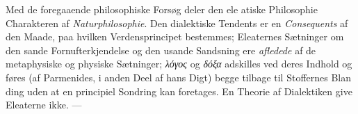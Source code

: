 \documentclass[12pt,a4paper]{book}
\newcommand{\gk}[1]{\textit{#1}}
\begin{document}
%
%
Med de foregaaende philosophiske Forsøg deler den ele\-%
atiske Philosophie Charakteren af \emph{Naturphilosophie}. Den
dialektiske Tendents er en \emph{Consequents} af den Maade, paa
hvilken Verdensprincipet bestemmes; Eleaternes Sætninger om
den sande Fornufterkjendelse og den usande Sandsning ere
\emph{afledede} af de metaphysiske og physiske Sætninger; \gk{λόγος}
og \gk{δόξα} adskilles ved deres Indhold og føres (af Parmenides,
i anden Deel af hans Digt) begge tilbage til Stoffernes Blan\-%
ding uden at en principiel Sondring kan foretages. En Theorie
af Dialektiken give Eleaterne ikke. ---
\end{document}
